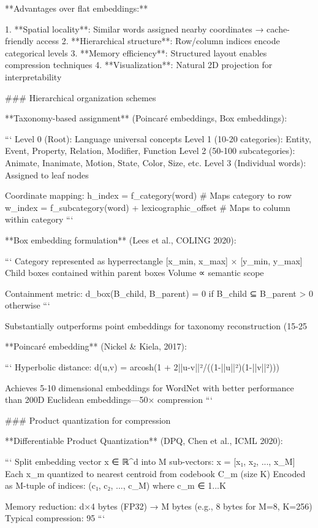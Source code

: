 \documentclass[11pt]{article}
\begin{document}
**Advantages over flat embeddings:**

1. **Spatial locality**: Similar words assigned nearby coordinates → cache-friendly access
2. **Hierarchical structure**: Row/column indices encode categorical levels
3. **Memory efficiency**: Structured layout enables compression techniques
4. **Visualization**: Natural 2D projection for interpretability

### Hierarchical organization schemes

**Taxonomy-based assignment** (Poincaré embeddings, Box embeddings):

```
Level 0 (Root): Language universal concepts
Level 1 (10-20 categories): Entity, Event, Property, Relation, Modifier, Function
Level 2 (50-100 subcategories): Animate, Inanimate, Motion, State, Color, Size, etc.
Level 3 (Individual words): Assigned to leaf nodes

Coordinate mapping:
h_index = f_category(word)  # Maps category to row
w_index = f_subcategory(word) + lexicographic_offset  # Maps to column within category
```

**Box embedding formulation** (Lees et al., COLING 2020):

```
Category represented as hyperrectangle [x_min, x_max] × [y_min, y_max]
Child boxes contained within parent boxes
Volume ∝ semantic scope

Containment metric: d_box(B_child, B_parent) = 0 if B_child ⊆ B_parent
                                                > 0 otherwise
```

Substantially outperforms point embeddings for taxonomy reconstruction (15-25%

**Poincaré embedding** (Nickel & Kiela, 2017):

```
Hyperbolic distance: d(u,v) = arcosh(1 + 2||u-v||²/((1-||u||²)(1-||v||²)))

Achieves 5-10 dimensional embeddings for WordNet with better performance
than 200D Euclidean embeddings—50× compression
```

### Product quantization for compression

**Differentiable Product Quantization** (DPQ, Chen et al., ICML 2020):

```
Split embedding vector x ∈ ℝ^d into M sub-vectors: x = [x₁, x₂, ..., x_M]
Each x_m quantized to nearest centroid from codebook C_m (size K)
Encoded as M-tuple of indices: (c₁, c₂, ..., c_M) where c_m ∈ {1...K}

Memory reduction: d×4 bytes (FP32) → M bytes (e.g., 8 bytes for M=8, K=256)
Typical compression: 95%
```
\end{document}
